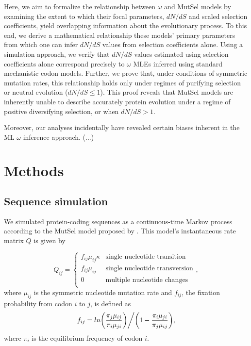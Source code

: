 \documentclass[11pt]{article}
\begin{document}
Here, we aim to formalize the relationship between $\omega$ and MutSel models by examining the extent to which their focal parameters, $dN/dS$ and scaled selection coefficients, yield overlapping information about the evolutionary process. To this end, we derive a mathematical relationship these models' primary parameters from which one can infer $dN/dS$ values from selection coefficients alone. Using a simulation approach, we verify that $dN/dS$ values estimated using selection coefficients alone correspond precisely to $\omega$ MLEs inferred using standard mechanistic codon models. Further, we prove that, under conditions of symmetric mutation rates, this relationship holds only under regimes of purifying selection or neutral evolution ($dN/dS \leq 1$). This proof reveals that MutSel models are inherently unable to describe accurately protein evolution under a regime of positive diversifying selection, or when $dN/dS > 1$.

Moreover, our analyses incidentally have revealed certain biases inherent in the ML $\omega$ inference approach. (...)
 


\section*{Methods}

\subsection*{Sequence simulation}
We simulated protein-coding sequences as a continuous-time Markov
process \cite{Yang2006} according to the MutSel model proposed by \cite{HalpernBruno1998}. This model's instantaneous rate matrix $Q$ is given by 

\begin{equation}
Q_{ij} = \left\{ \begin{array}{rl}
              f_{ij}\mu_{ij}\kappa               &\mbox{single nucleotide transition} \\
              f_{ij}\mu_{ij}                          &\mbox{single nucleotide transversion} \\
              0                                           &\mbox{multiple nucleotide changes} \\             
         \end{array} \right.,
\end{equation} where $\mu_{ij}$ is the symmetric nucleotide mutation rate and $f_{ij}$, the fixation probability from codon $i$ to $j$, is defined as \begin{equation}f_{ij} = ln\bigg{(}\frac{\pi_j\mu_{ij}}{\pi_i\mu_{ji}}\bigg{)}\bigg{/}\bigg{(}1 - \frac{\pi_i\mu_{ji}}{\pi_j\mu_{ij}}\bigg{)},\end{equation} where $\pi_i$ is the equilibrium frequency of codon $i$.
\end{document}
